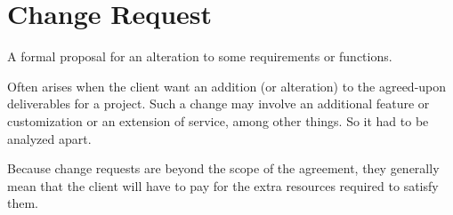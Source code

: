 \section{Change Request}
\label{sec:Change Request}

A formal proposal for an alteration to some requirements or functions.

Often arises when the client want an addition (or alteration) to the agreed-upon deliverables for a project. Such a change may involve an additional feature or customization or an extension of service, among other things. So it had to be analyzed apart.

Because change requests are beyond the scope of the agreement, they generally mean that the client will have to pay for the extra resources required to satisfy them.
